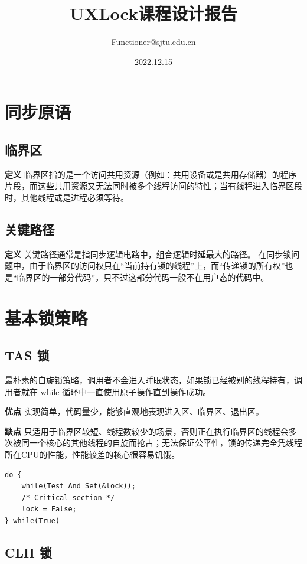 \documentclass[UTF8]{ctexart}
\title{UXLock课程设计报告}
\author{Functioner@sjtu.edu.cn}
\date{2022.12.15}
\begin{document}
\maketitle

\section{同步原语}

\subsection{临界区}
\textbf{定义} 临界区指的是一个访问共用资源（例如：共用设备或是共用存储器）的程序片段，而这些共用资源又无法同时被多个线程访问的特性；当有线程进入临界区段时，其他线程或是进程必须等待。

\subsection{关键路径}
\textbf{定义} 关键路径通常是指同步逻辑电路中，组合逻辑时延最大的路径。
在同步锁问题中，由于临界区的访问权只在“当前持有锁的线程”上，而“传递锁的所有权”也是“临界区的一部分代码”，只不过这部分代码一般不在用户态的代码中。

\section{基本锁策略}

\subsection{TAS 锁}
最朴素的自旋锁策略，调用者不会进入睡眠状态，如果锁已经被别的线程持有，调用者就在 while 循环中一直使用原子操作直到操作成功。

\textbf{优点} 实现简单，代码量少，能够直观地表现进入区、临界区、退出区。

\textbf{缺点} 只适用于临界区较短、线程数较少的场景，否则正在执行临界区的线程会多次被同一个核心的其他线程的自旋而抢占；无法保证公平性，锁的传递完全凭线程所在CPU的性能，性能较差的核心很容易饥饿。

\begin{lstlisting}
do {
    while(Test_And_Set(&lock));
    /* Critical section */
    lock = False;
} while(True)
\end{lstlisting}

\subsection{CLH 锁}
\end{document}
